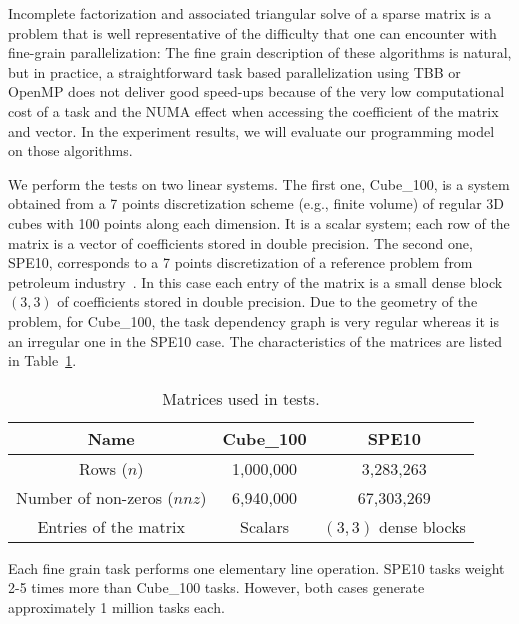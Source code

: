 Incomplete factorization and associated triangular solve of a sparse matrix
is a problem that is well representative of the difficulty that one can encounter
with fine-grain parallelization: The fine grain description of these algorithms
is natural, but in practice, a straightforward task based parallelization using TBB or
OpenMP does not deliver good speed-ups because of the very low computational cost of
a task and the NUMA effect when accessing the coefficient of the matrix and vector.
In the experiment results, we will evaluate our programming model on those algorithms.


We perform the tests on two linear systems. The first one, Cube\_100, is a
system obtained from a 7 points discretization scheme (e.g., finite volume) of regular
3D cubes with 100 points along each dimension.
It is a scalar system; each row of the matrix is a vector of coefficients stored in double precision.
The second one, SPE10, corresponds to a 7 points discretization of a reference problem from petroleum industry~\cite{spe10}.
In this case each entry of the matrix is a small dense block $(3,3)$ of coefficients stored in double precision.
Due to the geometry of the problem, for Cube\_100, the task dependency graph is very regular whereas it is an irregular one in the SPE10 case.
The characteristics of the matrices are listed in Table~\ref{matrices}.

\begin{table}[!h]
  \renewcommand{\arraystretch}{1.3}
  \caption{Matrices used in tests.}
  \label{matrices}
  \centering
  \begin{tabular}{|c||c|c|}
    \hline
    Name & Cube\_100 & SPE10\\
    \hline
    \hline
    Rows ($n$) & 1,000,000 & 3,283,263\\
    \hline
    Number of non-zeros ($nnz$) & 6,940,000 & 67,303,269\\
    \hline
    Entries of the matrix & Scalars & $(3,3)$ dense blocks\\
    \hline
  \end{tabular}
\end{table}

Each fine grain task performs one elementary line operation. SPE10
tasks weight 2-5 times more than Cube\_100 tasks. However, both
cases generate approximately 1 million tasks each.


